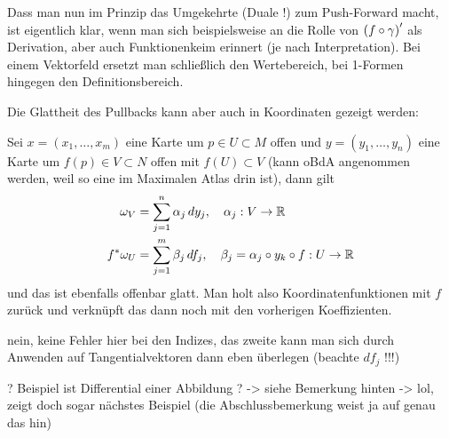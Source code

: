 \documentclass[../H_Analysis_main.tex]{subfiles}
\begin{document}
Dass man nun im Prinzip das Umgekehrte (Duale !) zum Push-Forward macht, ist eigentlich klar, wenn man sich beispielsweise an die Rolle von $\qty(f \circ \gamma)'$ als Derivation, aber auch Funktionenkeim erinnert (je nach Interpretation). Bei einem Vektorfeld ersetzt man schließlich den Wertebereich, bei 1-Formen hingegen den Definitionsbereich.


Die Glattheit des Pullbacks kann aber auch in Koordinaten gezeigt werden:
\begin{bsp}
Sei $x = (x_1, \dots, x_m)$ eine Karte um $p \in U \subset M$ offen und $y = (y_1, \dots, y_n)$ eine Karte um $f(p) \in V \subset N$ offen mit $f(U) \subset V$ (kann oBdA angenommen werden, weil so eine im Maximalen Atlas drin ist), dann gilt
\begin{align}
\omega_V &= \sum_{j = 1}^n \alpha_j \, dy_j, \quad \alpha_j: V \rightarrow \mathbb{R}
\notag\\
f^*\omega_U &= \sum_{j = 1}^m \beta_j \, df_j, \quad \beta_j = \alpha_j \circ y_k \circ f: U \rightarrow \mathbb{R}
\end{align}
und das ist ebenfalls offenbar glatt. Man holt also Koordinatenfunktionen mit $f$ zurück und verknüpft das dann noch mit den vorherigen Koeffizienten.

nein, keine Fehler hier bei den Indizes, das zweite kann man sich durch Anwenden auf Tangentialvektoren dann eben überlegen (beachte $d f_j$ !!!)
\end{bsp}

? Beispiel ist Differential einer Abbildung ? -> siehe Bemerkung hinten -> lol, zeigt doch sogar nächstes Beispiel (die Abschlussbemerkung weist ja auf genau das hin)
\end{document}
